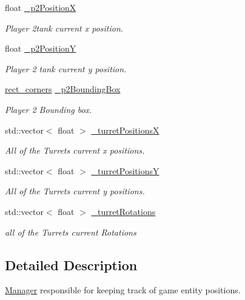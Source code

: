 \begin{DoxyCompactItemize}
float \hyperlink{classTrackingManager_a0f3a043190aba11b137c52052dc2ed3a}{\-\_\-p2\-Position\-X}
\begin{DoxyCompactList}\small\item\em Player 2tank current x position. \end{DoxyCompactList}\item 
float \hyperlink{classTrackingManager_ad4d803802447b6c8a1a09104263fd829}{\-\_\-p2\-Position\-Y}
\begin{DoxyCompactList}\small\item\em Player 2 tank current y position. \end{DoxyCompactList}\item 
\hyperlink{structrect__corners}{rect\-\_\-corners} \hyperlink{classTrackingManager_a345399f12e52bc4b23786fe73b26a6ff}{\-\_\-p2\-Bounding\-Box}
\begin{DoxyCompactList}\small\item\em Player 2 Bounding box. \end{DoxyCompactList}\item 
std\-::vector$<$ float $>$ \hyperlink{classTrackingManager_ad66641438bdcf33e772ef4ec1cdc7e14}{\-\_\-turret\-Positions\-X}
\begin{DoxyCompactList}\small\item\em All of the Turrets current x positions. \end{DoxyCompactList}\item 
std\-::vector$<$ float $>$ \hyperlink{classTrackingManager_aaf2aa5d29aa7a7abd3a7e7f27bff7340}{\-\_\-turret\-Positions\-Y}
\begin{DoxyCompactList}\small\item\em All of the Turrets current y positions. \end{DoxyCompactList}\item 
std\-::vector$<$ float $>$ \hyperlink{classTrackingManager_adce9702d80c3554e7a359a145a6d2632}{\-\_\-turret\-Rotations}
\begin{DoxyCompactList}\small\item\em all of the Turrets current Rotations \end{DoxyCompactList}\end{DoxyCompactItemize}


\subsection{Detailed Description}
\hyperlink{classManager}{Manager} responsible for keeping track of game entity positions. 

